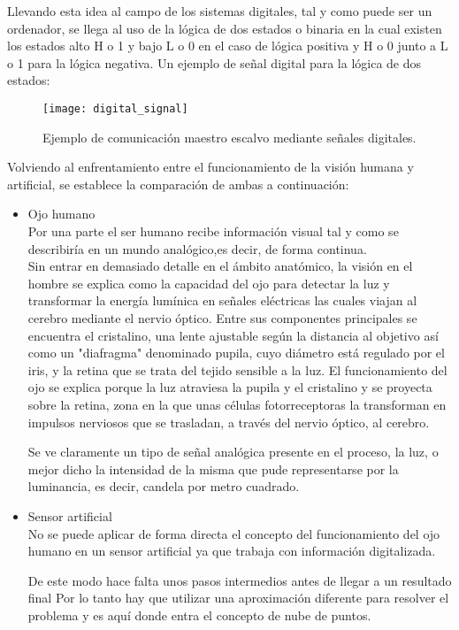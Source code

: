 \begin{itemize}
Llevando esta idea al campo de los sistemas digitales, tal y como puede ser un ordenador, se llega al uso de la lógica de dos estados o binaria en la cual existen los estados alto H o 1 y bajo L o 0 en el caso de lógica positiva y H o 0 junto a L o 1 para la lógica negativa.
Un ejemplo de señal digital para la lógica de dos estados:

\begin{figure}[!htb]
\centering
{}
  \texttt{[image: digital\_signal]}
  \caption{Ejemplo de comunicación maestro escalvo mediante señales digitales.}\label{fig:digital_signal}
\endminipage\hfill
\end{figure}

\end{itemize}


Volviendo al enfrentamiento entre el funcionamiento de la visión humana y artificial, se establece la comparación de ambas a continuación:

\begin{itemize}
\item Ojo humano
\\
Por una parte el ser humano recibe información visual tal y como se describiría en un mundo analógico,es decir, de forma continua.
\\
Sin entrar en demasiado detalle en el ámbito anatómico, la visión en el hombre se explica como la capacidad del ojo para detectar la luz y transformar la energía lumínica en señales eléctricas las cuales viajan al cerebro mediante el nervio óptico. Entre sus componentes principales se encuentra el cristalino, una lente ajustable según la distancia al objetivo así como un "diafragma" denominado pupila, cuyo diámetro está regulado por el iris, y la retina que se trata del tejido sensible a la luz. 
El funcionamiento del ojo se explica porque la luz atraviesa la pupila y el cristalino y se proyecta sobre la retina, zona en la que unas células fotorreceptoras la transforman en impulsos nerviosos que se trasladan, a través del nervio óptico, al cerebro.

Se ve claramente un tipo de señal analógica presente en el proceso, la luz, o mejor dicho la intensidad de la misma que pude representarse por la luminancia, es decir, candela por metro cuadrado.


\item Sensor artificial
\\
No se puede aplicar de forma directa el concepto del funcionamiento del ojo humano en un sensor artificial ya que trabaja con información digitalizada. 

De este modo hace falta unos pasos intermedios antes de llegar a un resultado final Por lo tanto hay que utilizar una aproximación diferente para resolver el problema y es aquí donde entra el concepto de nube de puntos. 
\end{itemize}

